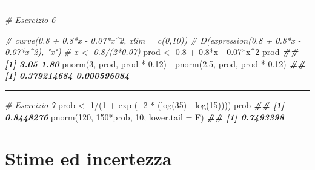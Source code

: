 \documentclass[
  12pt,
]{book}
\newenvironment{Shaded}{\begin{snugshade}}{\end{snugshade}}
\newcommand{\AttributeTok}[1]{\textcolor[rgb]{0.77,0.63,0.00}{#1}}
\newcommand{\CommentTok}[1]{\textcolor[rgb]{0.56,0.35,0.01}{\textit{#1}}}
\newcommand{\DecValTok}[1]{\textcolor[rgb]{0.00,0.00,0.81}{#1}}
\newcommand{\DocumentationTok}[1]{\textcolor[rgb]{0.56,0.35,0.01}{\textbf{\textit{#1}}}}
\newcommand{\FloatTok}[1]{\textcolor[rgb]{0.00,0.00,0.81}{#1}}
\newcommand{\FunctionTok}[1]{\textcolor[rgb]{0.00,0.00,0.00}{#1}}
\newcommand{\NormalTok}[1]{#1}
\newcommand{\OtherTok}[1]{\textcolor[rgb]{0.56,0.35,0.01}{#1}}
\newcommand{\SpecialCharTok}[1]{\textcolor[rgb]{0.00,0.00,0.00}{#1}}
\begin{document}
\begin{center}\rule{0.5\linewidth}{0.5pt}\end{center}

\begin{Shaded}
\begin{Highlighting}[]
\CommentTok{\# Esercizio 6}

\CommentTok{\# curve(0.8 + 0.8*x {-} 0.07*x\^{}2, xlim = c(0,10))}
\CommentTok{\# D(expression(0.8 + 0.8*x {-} 0.07*x\^{}2), "x")}
\CommentTok{\# x \textless{}{-} 0.8/(2*0.07)}
\NormalTok{prod }\OtherTok{\textless{}{-}} \FloatTok{0.8} \SpecialCharTok{+} \FloatTok{0.8}\SpecialCharTok{*}\NormalTok{x }\SpecialCharTok{{-}} \FloatTok{0.07}\SpecialCharTok{*}\NormalTok{x}\SpecialCharTok{\^{}}\DecValTok{2}
\NormalTok{prod}
\DocumentationTok{\#\# [1] 3.05 1.80}
\FunctionTok{pnorm}\NormalTok{(}\DecValTok{3}\NormalTok{, prod, prod }\SpecialCharTok{*} \FloatTok{0.12}\NormalTok{) }\SpecialCharTok{{-}} \FunctionTok{pnorm}\NormalTok{(}\FloatTok{2.5}\NormalTok{, prod, prod }\SpecialCharTok{*} \FloatTok{0.12}\NormalTok{)}
\DocumentationTok{\#\# [1] 0.379214684 0.000596084}
\end{Highlighting}
\end{Shaded}

\begin{center}\rule{0.5\linewidth}{0.5pt}\end{center}

\begin{Shaded}
\begin{Highlighting}[]
\CommentTok{\# Esercizio 7}
\NormalTok{prob }\OtherTok{\textless{}{-}} \DecValTok{1}\SpecialCharTok{/}\NormalTok{(}\DecValTok{1} \SpecialCharTok{+} \FunctionTok{exp}\NormalTok{ ( }\SpecialCharTok{{-}}\DecValTok{2} \SpecialCharTok{*}\NormalTok{ (}\FunctionTok{log}\NormalTok{(}\DecValTok{35}\NormalTok{) }\SpecialCharTok{{-}} \FunctionTok{log}\NormalTok{(}\DecValTok{15}\NormalTok{))))}
\NormalTok{prob}
\DocumentationTok{\#\# [1] 0.8448276}
\FunctionTok{pnorm}\NormalTok{(}\DecValTok{120}\NormalTok{, }\DecValTok{150}\SpecialCharTok{*}\NormalTok{prob, }\DecValTok{10}\NormalTok{, }\AttributeTok{lower.tail =}\NormalTok{ F)}
\DocumentationTok{\#\# [1] 0.7493398}
\end{Highlighting}
\end{Shaded}

\hypertarget{stime-ed-incertezza}{%
\chapter{Stime ed incertezza}\label{stime-ed-incertezza}}
\end{document}
